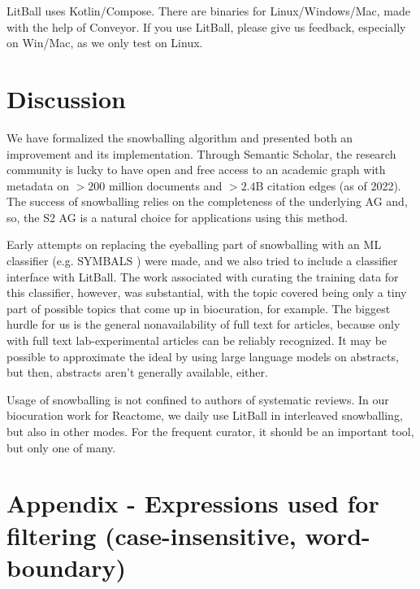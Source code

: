 \documentclass{article}
\begin{document}
LitBall uses Kotlin/Compose. There are binaries for Linux/Windows/Mac, made with the help of Conveyor. If you use LitBall, please give us feedback, especially on Win/Mac, as we only test on Linux.

\section*{Discussion}
We have formalized the snowballing algorithm and presented both an improvement and its implementation.
Through Semantic Scholar, the research community is lucky to have open and free access to an academic graph with metadata on $>200$ million documents and $>2.4$B citation edges (as of 2022\cite{Kinney2023TheSS}). The success of snowballing relies on the completeness of the underlying AG and, so, the S2 AG is a natural choice for applications using this method.

Early attempts on replacing the eyeballing part of snowballing with an ML classifier (e.g. SYMBALS \cite{van2021symbals}) were made, and we also tried to include a classifier interface with LitBall\cite{ralf_stephan_2023_8388963}. The work associated with curating the training data for this classifier, however, was substantial, with the topic covered being only a tiny part of possible topics that come up in biocuration, for example. The biggest hurdle for us is the general nonavailability of full text for articles, because only with full text lab-experimental articles can be reliably recognized. It may be possible to approximate the ideal by using large language models on abstracts, but then, abstracts aren't generally available, either.

Usage of snowballing is not confined to authors of systematic reviews. In our biocuration work for Reactome\cite{milacic2024reactome}, we daily use LitBall in interleaved snowballing, but also in other modes. For the frequent curator, it should be an important tool, but only one of many.


\printbibliography
\clearpage
\appendix
\section*{Appendix - Expressions used for filtering (case-insensitive, word-boundary)}\label{app}
\end{document}
